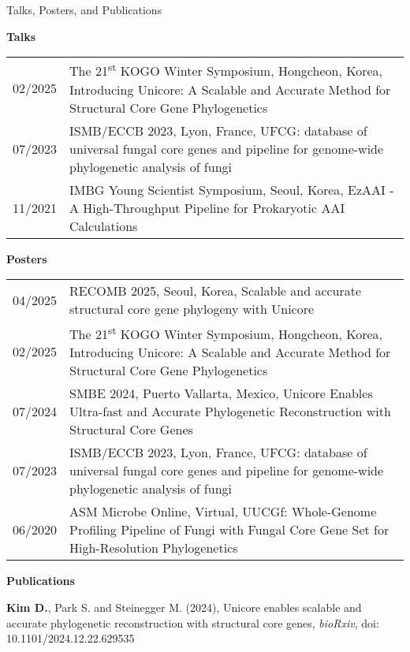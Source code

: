 \documentclass{resume} %
\begin{document}
\begin{rSection}{Talks, Posters, and Publications}
\vspace{2mm}

{\bf Talks }\vspace{1mm}

\begin{tabular}{p{2.5cm}p{14.1cm}}
02/2025 & The 21\textsuperscript{st} KOGO Winter Symposium, Hongcheon, Korea, Introducing Unicore: A Scalable and Accurate Method for Structural Core Gene Phylogenetics
\\[1mm]
07/2023 & ISMB/ECCB 2023, Lyon, France, UFCG: database of universal fungal core genes and pipeline for genome-wide phylogenetic analysis of fungi
\\[1mm]
11/2021 & IMBG Young Scientist Symposium, Seoul, Korea, EzAAI - A High-Throughput Pipeline for Prokaryotic AAI Calculations
\\[1mm]
\end{tabular}
\vspace{1mm}

{\bf Posters }\vspace{1mm}

\begin{tabular}{p{2.5cm}p{14.1cm}}
04/2025 & RECOMB 2025, Seoul, Korea, Scalable and accurate structural core gene phylogeny with Unicore
\\[1mm]
02/2025 & The 21\textsuperscript{st} KOGO Winter Symposium, Hongcheon, Korea, Introducing Unicore: A Scalable and Accurate Method for Structural Core Gene Phylogenetics
\\[1mm]
07/2024 & SMBE 2024, Puerto Vallarta, Mexico, Unicore Enables Ultra-fast and Accurate Phylogenetic Reconstruction with Structural Core Genes
\\[1mm]
07/2023 & ISMB/ECCB 2023, Lyon, France, UFCG: database of universal fungal core genes and pipeline for genome-wide phylogenetic analysis of fungi
\\[1mm]
06/2020 & ASM Microbe Online, Virtual, UUCGf: Whole-Genome Profiling Pipeline of Fungi with Fungal Core Gene Set for High-Resolution Phylogenetics
\\[1mm]
\end{tabular}
\vspace{1mm}


{\bf Publications}\\[-26mm]

\begin{thebibliography}{10}

\vspace{8mm}
{\bf Kim D.}, Park S. and Steinegger M. (2024),
Unicore enables scalable and accurate phylogenetic reconstruction with structural core genes, {\em bioRxiv}, doi: 10.1101/2024.12.22.629535
	

\end{thebibliography}
\end{rSection}
\end{document}
